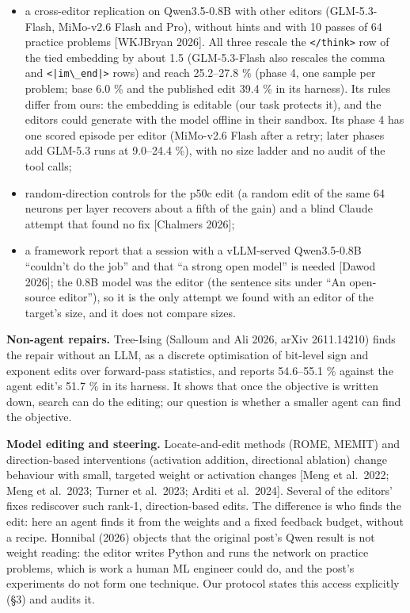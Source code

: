 \documentclass[
  10pt,
]{article}
\newcommand{\passthrough}[1]{#1}
\begin{document}
\begin{itemize}
\item
  a cross-editor replication on Qwen3.5-0.8B with other editors
  (GLM-5.3-Flash, MiMo-v2.6 Flash and Pro), without hints and with 10
  passes of 64 practice problems {[}WKJBryan 2026{]}. All three rescale
  the \passthrough{\lstinline!</think>!} row of the tied embedding by
  about 1.5 (GLM-5.3-Flash also rescales the comma and
  \passthrough{\lstinline!<|im\_end|>!} rows) and reach 25.2--27.8 \%
  (phase 4, one sample per problem; base 6.0 \% and the published edit
  39.4 \% in its harness). Its rules differ from ours: the embedding is
  editable (our task protects it), and the editors could generate with
  the model offline in their sandbox. Its phase 4 has one scored episode
  per editor (MiMo-v2.6 Flash after a retry; later phases add GLM-5.3
  runs at 9.0--24.4 \%), with no size ladder and no audit of the tool
  calls;
\item
  random-direction controls for the p50c edit (a random edit of the same
  64 neurons per layer recovers about a fifth of the gain) and a blind
  Claude attempt that found no fix {[}Chalmers 2026{]};
\item
  a framework report that a session with a vLLM-served Qwen3.5-0.8B
  ``couldn't do the job'' and that ``a strong open model'' is needed
  {[}Dawod 2026{]}; the 0.8B model was the editor (the sentence sits
  under ``An open-source editor''), so it is the only attempt we found
  with an editor of the target's size, and it does not compare sizes.
\end{itemize}

\textbf{Non-agent repairs.} Tree-Ising (Salloum and Ali 2026, arXiv
2611.14210) finds the repair without an LLM, as a discrete optimisation
of bit-level sign and exponent edits over forward-pass statistics, and
reports 54.6--55.1 \% against the agent edit's 51.7 \% in its harness.
It shows that once the objective is written down, search can do the
editing; our question is whether a smaller agent can find the objective.

\textbf{Model editing and steering.} Locate-and-edit methods (ROME,
MEMIT) and direction-based interventions (activation addition,
directional ablation) change behaviour with small, targeted weight or
activation changes {[}Meng et al.~2022; Meng et al.~2023; Turner et
al.~2023; Arditi et al.~2024{]}. Several of the editors' fixes
rediscover such rank-1, direction-based edits. The difference is who
finds the edit: here an agent finds it from the weights and a fixed
feedback budget, without a recipe. Honnibal (2026) objects that the
original post's Qwen result is not weight reading: the editor writes
Python and runs the network on practice problems, which is work a human
ML engineer could do, and the post's experiments do not form one
technique. Our protocol states this access explicitly (\S{}3) and audits
it.
\end{document}
